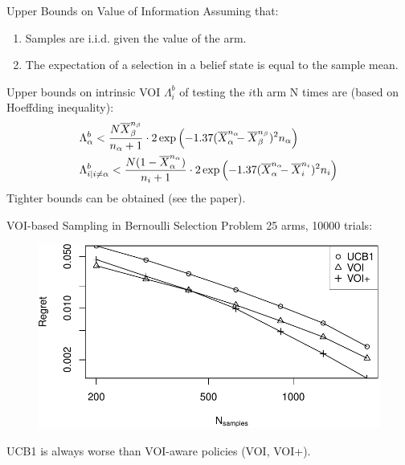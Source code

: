 \documentclass{beamer}
\title{}
\author{}
\institute{}
\date{}
\begin{document}

\begin{frame}{Upper Bounds on Value of Information}
Assuming that:
\begin{enumerate}
\item Samples are i.i.d. given the value of the arm.
\item The expectation of a selection in a belief state is equal to the sample mean.
\end{enumerate}
Upper bounds on intrinsic VOI $\Lambda^b_i$ of testing the $i$th arm N
times are (based on Hoeffding inequality):
\begin{align*}
  \Lambda&_\alpha^b < \frac {N\overline X_\beta^{n_\beta}}
  {n_\alpha+1}\cdot 2\exp\left(- 1.37(\overline X_\alpha^{n_\alpha}\hspace{-0.5em} - \overline X_\beta^{n_\beta})^2 n_\alpha\right)\\
  \Lambda&_{i|i\ne\alpha}^b <  \frac {N(1-\overline
    X_\alpha^{n_\alpha})} {n_i+1}\cdot 2\exp\left(- 1.37(\overline X_\alpha^{n_\alpha}\hspace{-0.5em} - \overline X_i^{n_i})^2 n_i\right)
\end{align*}
Tighter bounds can be obtained (see the paper).
\end{frame}

\begin{frame}{VOI-based Sampling in Bernoulli Selection Problem}
25 arms, 10000 trials:
\begin{figure}[h]
\centering
\includegraphics[scale=0.65]{flat.pdf}
\end{figure}
UCB1 is always worse than VOI-aware policies (VOI, VOI+).
\end{frame}
\end{document}
